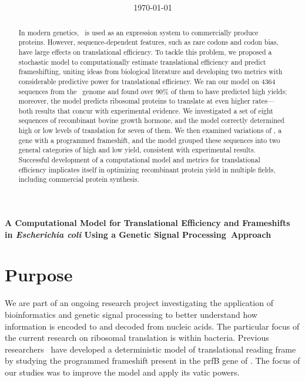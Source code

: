 \documentclass[12pt]{article}
\author{\sc{\BWFauthors}}
\date{{\sc \today}}
\title{\bf{\BWFtitle{\emph}}}
\newcommand{\BWFtitle}[2]{A Computational Model for Translational
  Efficiency and Frameshifts in #1{Escherichia coli} Using a Genetic Signal
  Processing#2Approach}
\begin{document}
\begin{singlespace}
  \tableofcontents
\end{singlespace}

\clearpage
\begin{Large}
\noindent\textbf{\BWFtitle{\emph}{~}}
\end{Large}
\begin{abstract}\begin{normalsize}
In modern genetics, \ecoli\ is used as an expression system to commercially 
produce proteins.  However, sequence-dependent features, such as rare codons 
and codon bias, have large effects on translational efficiency.  To tackle 
this problem, we proposed a stochastic model to computationally estimate 
translational efficiency and predict frameshifting, uniting ideas from biological 
literature and developing two metrics with considerable predictive power 
for translational efficiency. We ran our model on 4364 sequences from the 
\ecoli\ genome and found over 90\% of them to have predicted high yields; 
moreover, the model predicts ribosomal proteins to translate at even higher rates---both 
results that concur with experimental evidence.  We investigated a set of eight 
sequences of recombinant bovine growth hormone, and the model correctly determined 
high or low levels of translation for seven of them.  We then examined variations of
\prfB, a gene with a programmed frameshift, and the model grouped these sequences 
into two general categories of high and low yield, consistent 
with experimental results.  Successful development of a computational model and 
metrics for translational efficiency implicates itself in optimizing 
recombinant protein yield in multiple fields, including commercial protein synthesis.
\end{normalsize}\end{abstract}  
  
\clearpage
{}

\section{Purpose}
We are part of an ongoing research project
investigating the application of bioinformatics
and genetic signal processing to better understand how
information is encoded to and decoded from nucleic acids.  The particular
focus of the current research on ribosomal translation is within
bacteria.  Previous researchers~\cite{lalit:mechanics}
have developed a deterministic model
of translational reading frame by studying the
programmed frameshift present in the prfB gene of \ecoli.  The focus
of our studies was to improve the model and apply its vatic powers.
\end{document}
